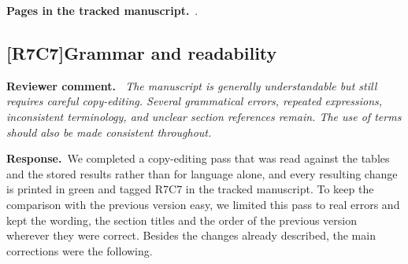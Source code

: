 \documentclass[11pt,a4paper]{article}
\newcommand{\comment}[3]{\subsection*{\textcolor{#1}{[#2]}\enspace #3}}
\newenvironment{reviewercomment}{\par\noindent\textbf{Reviewer comment.}\itshape\ }{\par}
\newcommand{\response}{\par\noindent\textbf{Response.}\ }
\newcommand{\where}[1]{\par\noindent\textbf{Pages in the tracked manuscript.}\ \rvpages[M-]{#1}.}
\begin{document}
\where{R7C6}

\comment{rvEdit}{R7C7}{Grammar and readability}
\begin{reviewercomment}
The manuscript is generally understandable but still requires careful copy-editing. Several grammatical errors, repeated expressions, inconsistent terminology, and unclear section references remain. The use of terms should also be made consistent throughout.
\end{reviewercomment}
\response We completed a copy-editing pass that was read against the tables and the stored results rather than for language alone, and every resulting change is printed in green and tagged R7C7 in the tracked manuscript. To keep the comparison with the previous version easy, we limited this pass to real errors and kept the wording, the section titles and the order of the previous version wherever they were correct. Besides the changes already described, the main corrections were the following.
\end{document}
